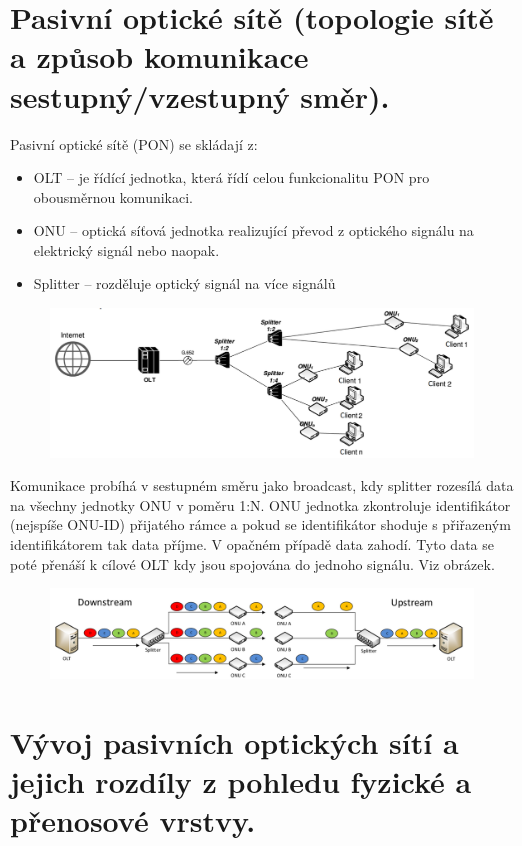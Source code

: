 \clearpage
\section{Pasivní optické sítě (topologie sítě a způsob komunikace sestupný/vzestupný směr).}
Pasivní optické sítě (PON) se skládají z:
\begin{itemize}
    \item OLT -- je řídící jednotka, která řídí celou funkcionalitu PON pro obousměrnou komunikaci.
    \item ONU -- optická síťová jednotka realizující převod z optického signálu na elektrický signál nebo naopak.
    \item Splitter -- rozděluje optický signál na více signálů
\end{itemize}
\begin{figure} [h]
    \centering
    \includegraphics[width=\textwidth]{snimky/PONTopologie.png}
    \label{fig:pon}
\end{figure}

Komunikace probíhá v sestupném směru jako broadcast, kdy splitter rozesílá data na všechny jednotky ONU v poměru 1:N. ONU jednotka zkontroluje identifikátor (nejspíše ONU-ID) přijatého rámce a pokud se identifikátor shoduje s přiřazeným identifikátorem tak data příjme. V opačném případě data zahodí. Tyto data se poté přenáší k cílové OLT kdy jsou spojována do jednoho signálu. Viz obrázek.

\begin{figure} [h]
    \centering
    \includegraphics[width=\textwidth]{snimky/upDownPON.png}
\end{figure}

\clearpage
\section{Vývoj pasivních optických sítí a jejich rozdíly z pohledu fyzické a přenosové vrstvy.}

